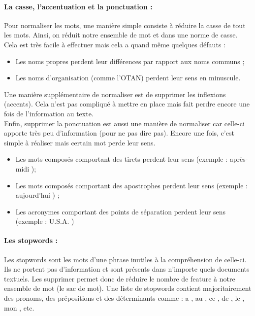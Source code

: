                 \paragraph{La casse, l'accentuation et la ponctuation :}
                    Pour normaliser les mots, une manière simple consiste à réduire la casse de tout les mots. Ainsi, on réduit notre ensemble de mot et dans une norme de casse. Cela est très facile à effectuer mais cela a quand même quelques défauts :
                    \begin{itemize}
                        \item Les noms propres perdent leur différences par rapport aux noms communs ;
                        \item Les noms d'organisation (comme l'OTAN) perdent leur sens en minuscule.
                    \end{itemize}
                    Une manière supplémentaire de normaliser est de supprimer les inflexions (accents). Cela n'est pas compliqué à mettre en place mais fait perdre encore une fois de l'information au texte.\\
                    Enfin, supprimer la ponctuation est aussi une manière de normaliser car celle-ci apporte très peu d'information (pour ne pas dire pas). Encore une fois, c'est simple à réaliser mais certain mot perde leur sens.
                    \begin{itemize}
                        \item Les mots composés comportant des tirets perdent leur sens (exemple : \og après-midi \fg);
                        \item Les mots composés comportant des apostrophes perdent leur sens (exemple : \og aujourd'hui \fg) ;
                        \item Les acronymes comportant des points de séparation perdent leur sens (exemple : \og U.S.A. \fg)
                    \end{itemize}

                \paragraph{Les stopwords :}
                    Les stopwords sont les mots d'une phrase inutiles à la compréhension de celle-ci. Ils ne portent pas d'information et sont présents dans n'importe quels documents textuels. Les supprimer permet donc de réduire le nombre de feature à notre ensemble de mot (le sac de mot). Une liste de stopwords contient majoritairement des pronoms, des prépositions et des déterminants comme : \og a \fg, \og au \fg, \og ce \fg, \og de \fg, \og le \fg, \og mon \fg, etc.

